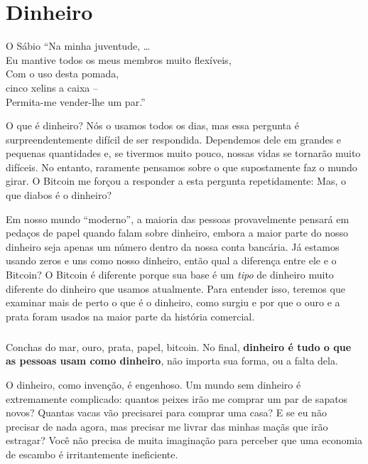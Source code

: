 \chapter{Dinheiro}
\label{les:11}

\begin{chapquote}{O Sábio}
\enquote{Na minha juventude, \ldots \\
Eu mantive todos os meus membros muito flexíveis, \\
Com o uso desta pomada, \\
cinco xelins a caixa -- \\
Permita-me vender-lhe um par.}
\end{chapquote}

O que é dinheiro? Nós o usamos todos os dias, mas essa pergunta é surpreendentemente difícil de ser respondida. Dependemos dele em grandes e pequenas quantidades e, se tivermos muito pouco, nossas vidas se tornarão muito difíceis. No entanto, raramente pensamos sobre o que supostamente faz o mundo girar. O Bitcoin me forçou a responder a esta pergunta repetidamente: Mas, o que diabos é o dinheiro?

Em nosso mundo \enquote{moderno}, a maioria das pessoas provavelmente pensará em pedaços de papel quando falam sobre dinheiro, embora a maior parte do nosso dinheiro seja apenas um número dentro da nossa conta bancária. Já estamos usando zeros e uns como nosso dinheiro, então qual a diferença entre ele e o Bitcoin? O Bitcoin é diferente porque sua base é um \textit{tipo} de dinheiro muito diferente do dinheiro que usamos atualmente. Para entender isso, teremos que examinar mais de perto o que é o dinheiro, como surgiu e por que o ouro e a prata foram usados na maior parte da história comercial.

\paragraph{}
Conchas do mar, ouro, prata, papel, bitcoin. No final, \textbf{dinheiro é tudo o que as pessoas usam como dinheiro}, não importa sua forma, ou a falta dela.

O dinheiro, como invenção, é engenhoso. Um mundo sem dinheiro é extremamente complicado: quantos peixes irão me comprar um par de sapatos novos? Quantas vacas vão precisarei para comprar uma casa? E se eu não precisar de nada agora, mas precisar me livrar das minhas maçãs que irão estragar? Você não precisa de muita imaginação para perceber que uma economia de escambo é irritantemente ineficiente.

